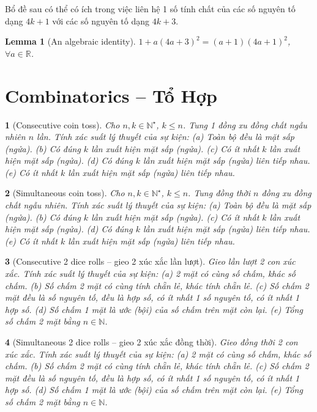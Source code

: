 \documentclass{article}
\newtheorem{baitoan}{}
\newtheorem{lemma}{Lemma}
\begin{document}
Bổ đề sau có thể có ích trong việc liên hệ 1 số tính chất của các số nguyên tố dạng $4k + 1$ với các số nguyên tố dạng $4k + 3$.

\begin{lemma}[An algebraic identity]
	$1 + a(4a + 3)^2 = (a + 1)(4a + 1)^2$, $\forall a\in\mathbb{R}$.
\end{lemma}


\section{Combinatorics -- Tổ Hợp}

\begin{baitoan}[Consecutive coin toss]
	Cho $n,k\in\mathbb{N}^\star$, $k\le n$. Tung 1 đồng xu đồng chất ngẫu nhiên $n$ lần. Tính xác suất lý thuyết của sự kiện: (a) Toàn bộ đều là mặt sấp (ngửa). (b) Có đúng $k$ lần xuất hiện mặt sấp (ngửa). (c) Có ít nhất $k$ lần xuất hiện mặt sấp (ngửa). (d) Có đúng $k$ lần xuất hiện mặt sấp (ngửa) liên tiếp nhau. (e) Có ít nhất $k$ lần xuất hiện mặt sấp (ngửa) liên tiếp nhau.
\end{baitoan}

\begin{baitoan}[Simultaneous coin toss]
	Cho $n,k\in\mathbb{N}^\star$, $k\le n$. Tung đồng thời $n$ đồng xu đồng chất ngẫu nhiên. Tính xác suất lý thuyết của sự kiện: (a) Toàn bộ đều là mặt sấp (ngửa). (b) Có đúng $k$ lần xuất hiện mặt sấp (ngửa). (c) Có ít nhất $k$ lần xuất hiện mặt sấp (ngửa). (d) Có đúng $k$ lần xuất hiện mặt sấp (ngửa) liên tiếp nhau. (e) Có ít nhất $k$ lần xuất hiện mặt sấp (ngửa) liên tiếp nhau.
\end{baitoan}

\begin{baitoan}[Consecutive 2 dice rolls -- gieo 2 xúc xắc lần lượt]
	Gieo lần lượt 2 con xúc xắc. Tính xác suất lý thuyết của sự kiện: (a) 2 mặt có cùng số chấm, khác số chấm. (b) Số chấm 2 mặt có cùng tính chẵn lẻ, khác tính chẵn lẻ. (c) Số chấm 2 mặt đều là số nguyên tố, đều là hợp số, có ít nhất 1 số nguyên tố, có ít nhất 1 hợp số. (d) Số chấm 1 mặt là ước (bội) của số chấm trên mặt còn lại. (e) Tổng số chấm 2 mặt bằng $n\in\mathbb{N}$.
\end{baitoan}

\begin{baitoan}[Simultaneous 2 dice rolls -- gieo 2 xúc xắc đồng thời]
	Gieo đồng thời 2 con xúc xắc. Tính xác suất lý thuyết của sự kiện: (a) 2 mặt có cùng số chấm, khác số chấm. (b) Số chấm 2 mặt có cùng tính chẵn lẻ, khác tính chẵn lẻ. (c) Số chấm 2 mặt đều là số nguyên tố, đều là hợp số, có ít nhất 1 số nguyên tố, có ít nhất 1 hợp số. (d) Số chấm 1 mặt là ước (bội) của số chấm trên mặt còn lại. (e) Tổng số chấm 2 mặt bằng $n\in\mathbb{N}$.
\end{baitoan}
\end{document}
